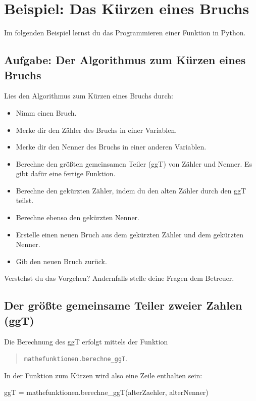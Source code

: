 \section{Beispiel: Das Kürzen eines Bruchs}

Im folgenden Beispiel lernst du das Programmieren einer Funktion in Python.

\subsection*{Aufgabe: Der Algorithmus zum Kürzen eines Bruchs}

Lies den Algorithmus zum Kürzen eines Bruchs durch:

\begin{itemize}
	\item Nimm einen Bruch.
	\item Merke dir den Zähler des Bruchs in einer Variablen.
	\item Merke dir den Nenner des Bruchs in einer anderen Variablen.
	\item Berechne den größten gemeinsamen Teiler (ggT) von Zähler und Nenner. Es gibt dafür eine fertige Funktion.
	\item Berechne den gekürzten Zähler, indem du den alten Zähler durch den ggT teilst. 
	\item Berechne ebenso den gekürzten Nenner.
	\item Erstelle einen neuen Bruch aus dem gekürzten Zähler und dem gekürzten Nenner.
	\item Gib den neuen Bruch zurück.
\end{itemize}

Verstehst du das Vorgehen? Andernfalls stelle deine Fragen dem Betreuer.

\subsection*{Der größte gemeinsame Teiler zweier Zahlen (ggT)}
\label{sec:FunktionGgT}

Die Berechnung des ggT erfolgt mittels der Funktion
\begin{quote}
\texttt{mathefunktionen.berechne\_ggT}.
\end{quote}

In der Funktion zum Kürzen wird also eine Zeile enthalten sein:

\begin{codePython}
ggT = mathefunktionen.berechne_ggT(alterZaehler, alterNenner)
\end{codePython}


